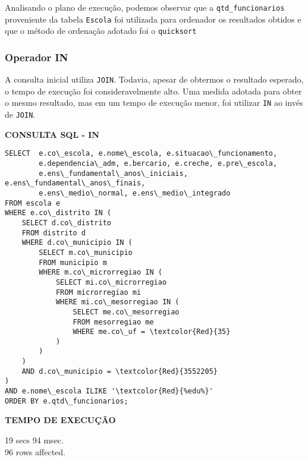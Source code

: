 \documentclass[12pt,a4paper]{article}
\begin{document}

Analisando o plano de execução, podemos observar que a \texttt{qtd\_funcionarios} proveniente da tabela \texttt{Escola} foi utilizada para ordenador os resultados obtidos e que o método de ordenação adotado foi o \texttt{quicksort} 


\subsubsection{Operador IN}

A consulta inicial utiliza \texttt{JOIN}. Todavia, apesar de obtermos o resultado esperado, o tempo de execução foi consideravelmente alto. Uma medida adotada para obter o mesmo resultado, mas em um tempo de execução menor, foi utilizar \texttt{IN} ao invés de \texttt{JOIN}. 

\vspace{0.5cm}

\begin{flushleft}
\textbf{CONSULTA SQL - IN}\\
\end{flushleft}

\begin{Verbatim}[commandchars=\\\{\}]
SELECT  e.co\_escola, e.nome\_escola, e.situacao\_funcionamento, 
        e.dependencia\_adm, e.bercario, e.creche, e.pre\_escola,
        e.ens\_fundamental\_anos\_iniciais, e.ens\_fundamental\_anos\_finais,
        e.ens\_medio\_normal, e.ens\_medio\_integrado
FROM escola e
WHERE e.co\_distrito IN (
    SELECT d.co\_distrito
    FROM distrito d
    WHERE d.co\_municipio IN (
        SELECT m.co\_municipio
        FROM municipio m
        WHERE m.co\_microrregiao IN (
            SELECT mi.co\_microrregiao
            FROM microrregiao mi
            WHERE mi.co\_mesorregiao IN (
                SELECT me.co\_mesorregiao
                FROM mesorregiao me
                WHERE me.co\_uf = \textcolor{Red}{35}
            )
        )
    )
    AND d.co\_municipio = \textcolor{Red}{3552205}
)
AND e.nome\_escola ILIKE '\textcolor{Red}{%edu%}'
ORDER BY e.qtd\_funcionarios;
\end{Verbatim}

\begin{flushleft}
\textbf{TEMPO DE EXECUÇÃO}\\
\end{flushleft}
19 secs 94 msec.\\
96 rows affected.\\
\end{document}
